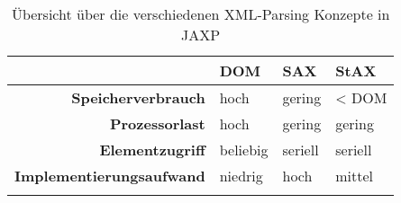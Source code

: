 \begin{table}[tb]
    \begin{longtable}[c]{r l l l}
        \toprule
        \rowcolor{lightgray}
        & \textbf{DOM}   & \textbf{SAX}   & \textbf{StAX} \\
        \midrule
        \textbf{Speicherverbrauch} & hoch & gering & \textless{} DOM\\
        \textbf{Prozessorlast} & hoch & gering & gering \\
        \textbf{Elementzugriff} & beliebig & seriell & seriell \\
        \textbf{Implementierungsaufwand} & niedrig & hoch & mittel \\
        \bottomrule
        \caption{Übersicht über die verschiedenen XML-Parsing Konzepte in JAXP}
        \label{tab:xmlParsingModels}
    \end{longtable}
\end{table}
